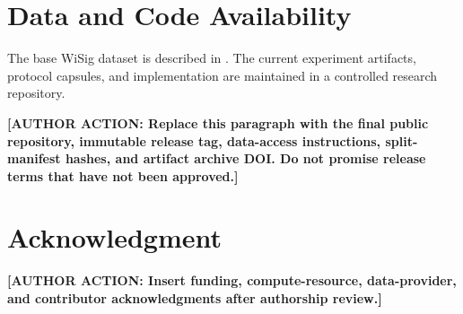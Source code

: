 \documentclass[journal]{IEEEtran}
\newcommand{\authoraction}[1]{\par\noindent\textbf{[AUTHOR ACTION: #1]}\par}
\begin{document}
\section*{Data and Code Availability}

The base WiSig dataset is described in \cite{hanna2022wisig}. The current experiment artifacts, protocol capsules, and implementation are maintained in a controlled research repository.
\authoraction{Replace this paragraph with the final public repository, immutable release tag, data-access instructions, split-manifest hashes, and artifact archive DOI. Do not promise release terms that have not been approved.}

\section*{Acknowledgment}
\authoraction{Insert funding, compute-resource, data-provider, and contributor acknowledgments after authorship review.}

\balance


\end{document}
